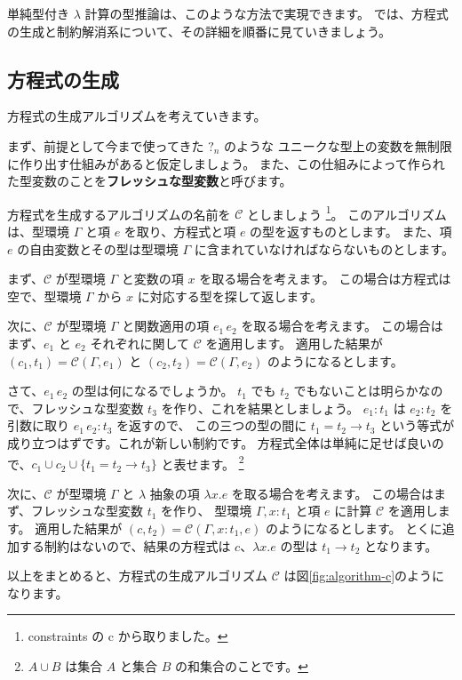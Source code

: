 単純型付き $\lambda$ 計算の型推論は、このような方法で実現できます。
では、方程式の生成と制約解消系について、その詳細を順番に見ていきましょう。

\subsection{方程式の生成}

方程式の生成アルゴリズムを考えていきます。

まず、前提として今まで使ってきた $?_n$ のような
ユニークな型上の変数を無制限に作り出す仕組みがあると仮定しましょう。
また、この仕組みによって作られた型変数のことを\textbf{フレッシュな型変数}と呼びます。

方程式を生成するアルゴリズムの名前を $\mathcal C$ としましょう
\footnote{constraints の c から取りました。}。
このアルゴリズムは、型環境 $\Gamma$ と項 $e$ を取り、方程式と項 $e$ の型を返すものとします。
また、項 $e$ の自由変数とその型は型環境 $\Gamma$ に含まれていなければならないものとします。

まず、$\mathcal C$ が型環境 $\Gamma$ と変数の項 $x$ を取る場合を考えます。
この場合は方程式は空で、型環境 $\Gamma$ から $x$ に対応する型を探して返します。

次に、$\mathcal C$ が型環境 $\Gamma$ と関数適用の項 $e_1 \, e_2$ を取る場合を考えます。
この場合はまず、$e_1$ と $e_2$ それぞれに関して $\mathcal C$ を適用します。
適用した結果が $(c_1, t_1) = \mathcal{C}(\Gamma, e_1)$ と $(c_2, t_2) = \mathcal{C}(\Gamma, e_2)$
のようになるとします。

さて、$e_1 \, e_2$ の型は何になるでしょうか。
$t_1$ でも $t_2$ でもないことは明らかなので、フレッシュな型変数 $t_3$ を作り、これを結果としましょう。
$e_1 : t_1$ は $e_2 : t_2$ を引数に取り $e_1 \, e_2 : t_3$ を返すので、
この三つの型の間に $t_1 = t_2 \to t_3$ という等式が成り立つはずです。これが新しい制約です。
方程式全体は単純に足せば良いので、$c_1 \cup c_2 \cup \{t_1 = t_2 \to t_3\}$ と表せます。
\footnote{$A \cup B$ は集合 $A$ と集合 $B$ の和集合のことです。}

次に、$\mathcal C$ が型環境 $\Gamma$ と $\lambda$ 抽象の項 $\lambda x . e$ を取る場合を考えます。
この場合はまず、フレッシュな型変数 $t_1$ を作り、
型環境 $\Gamma, x : t_1$ と項 $e$ に計算 $\mathcal C$ を適用します。
適用した結果が $(c, t_2) = \mathcal{C}(\Gamma, x : t_1, e)$ のようになるとします。
とくに追加する制約はないので、結果の方程式は $c$、$\lambda x . e$ の型は $t_1 \to t_2$ となります。

以上をまとめると、方程式の生成アルゴリズム $\mathcal C$ は図\ref{fig:algorithm-c}のようになります。

